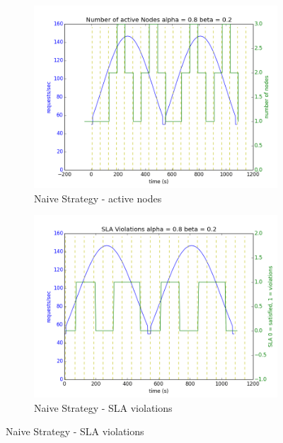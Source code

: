 \documentclass[12pt]{article}
\begin{document}
\begin{figure}[h!]
\begin{subfigure}{.5\textwidth}
\includegraphics[width=\textwidth]{Naive382nodes.png}
\caption{Naive Strategy - active nodes}
\end{subfigure}
\begin{subfigure}{.5\textwidth}
\includegraphics[width=\textwidth]{Naive382SLA.png}
\caption{Naive Strategy - SLA violations}
\end{subfigure}


\end{figure}
\end{document}
